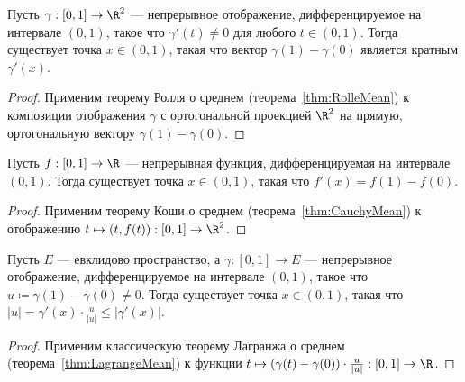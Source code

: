 \documentclass[
	extrafontsizes,
	11pt,
	hyphens,
]{memoir}
\begin{document}
\begin{theorem}
Пусть \(\gamma : [0,1] \to \R^2\) --- непрерывное отображение, дифференцируемое на интервале \((0,1)\), такое что \(\gamma'(t) \neq 0\) для любого \(t \in (0,1)\).%
\label{thm:CauchyMean}
Тогда существует точка \(x \in (0,1)\), такая что вектор \(\gamma(1) - \gamma(0)\) является кратным \(\gamma'(x)\).
\end{theorem}

\begin{proof}
Применим теорему Ролля о среднем (теорема~\ref{thm:RolleMean}) к композиции отображения \(\gamma\) с ортогональной проекцией \(\R^2\) на прямую, ортогональную вектору \(\gamma(1) - \gamma(0)\).
\end{proof}

\begin{theorem}
Пусть \(f : [0,1] \to \R\) --- непрерывная функция, дифференцируемая на интервале \((0,1)\).%
\label{thm:LagrangeMean}
Тогда существует точка \(x \in (0,1)\), такая что \(f'(x) = f(1) - f(0)\).
\end{theorem}

\begin{proof}
Применим теорему Коши о среднем (теорема~\ref{thm:CauchyMean}) к отображению
\(t \mapsto (t, f(t)) : [0,1] \to \R^2\).
\end{proof}

\begin{theorem}
Пусть \(E\) --- евклидово пространство, а \(\gamma : [0,1] \to E\) --- непрерывное отображение, дифференцируемое на интервале \((0,1)\),
такое что \(u \coloneqq \gamma(1) - \gamma(0) \neq 0\).%
Тогда существует точка \(x \in (0,1)\), такая что \(\lvert u \rvert = \gamma'(x) \cdot \frac{u}{\lvert u \rvert} \leq \lvert \gamma'(x) \rvert\).
\end{theorem}

\begin{proof}
Применим классическую теорему Лагранжа о среднем (теорема~\ref{thm:LagrangeMean}) к функции
\(t \mapsto (\gamma(t) - \gamma(0)) \cdot \frac{u}{\lvert u \rvert} : [0,1] \to \R\).
\end{proof}

\end{document}
